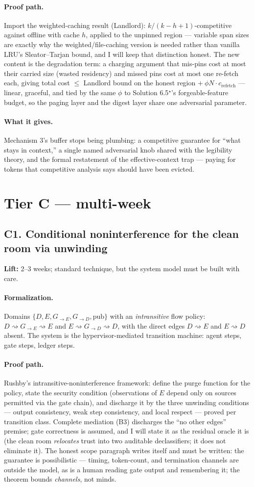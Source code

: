 \documentclass[11pt,a4paper]{article}
\newcommand{\lift}[1]{\noindent\textbf{Lift:} #1.}
\newcommand{\gives}{\paragraph{What it gives.}}
\newcommand{\form}{\paragraph{Formalization.}}
\newcommand{\proofpath}{\paragraph{Proof path.}}
\begin{document}
\proofpath Import the weighted-caching result (Landlord): $k/(k-h+1)$-competitive against offline with cache $h$, applied to the unpinned region --- variable span sizes are exactly why the weighted/file-caching version is needed rather than vanilla LRU's Sleator--Tarjan bound, and I will keep that distinction honest. The new content is the degradation term: a charging argument that mis-pins cost at most their carried size (wasted residency) and missed pins cost at most one re-fetch each, giving total cost $\le$ Landlord bound on the honest region $+\ \phi N \cdot c_{\mathrm{refetch}}$ --- linear, graceful, and tied by the same $\phi$ to Solution 6.5$^\star$'s forgeable-feature budget, so the paging layer and the digest layer share one adversarial parameter.

\gives Mechanism 3's buffer stops being plumbing: a competitive guarantee for ``what stays in context,'' a single named adversarial knob shared with the legibility theory, and the formal restatement of the effective-context trap --- paying for tokens that competitive analysis says should have been evicted.

\section{Tier C --- multi-week}

\subsection{C1. Conditional noninterference for the clean room via unwinding}
\lift{2--3 weeks; standard technique, but the system model must be built with care}

\form Domains $\{D, E, G_{\to E}, G_{\to D}, \mathrm{pub}\}$ with an \emph{intransitive} flow policy: $D \rightsquigarrow G_{\to E} \rightsquigarrow E$ and $E \rightsquigarrow G_{\to D} \rightsquigarrow D$, with the direct edges $D \rightsquigarrow E$ and $E \rightsquigarrow D$ absent. The system is the hypervisor-mediated transition machine: agent steps, gate steps, ledger steps.

\proofpath Rushby's intransitive-noninterference framework: define the purge function for the policy, state the security condition (observations of $E$ depend only on sources permitted via the gate chain), and discharge it by the three unwinding conditions --- output consistency, weak step consistency, and local respect --- proved per transition class. Complete mediation (B3) discharges the ``no other edges'' premise; gate correctness is assumed, and I will state it as the residual oracle it is (the clean room \emph{relocates} trust into two auditable declassifiers; it does not eliminate it). The honest scope paragraph writes itself and must be written: the guarantee is possibilistic --- timing, token-count, and termination channels are outside the model, as is a human reading gate output and remembering it; the theorem bounds \emph{channels}, not minds.
\end{document}
